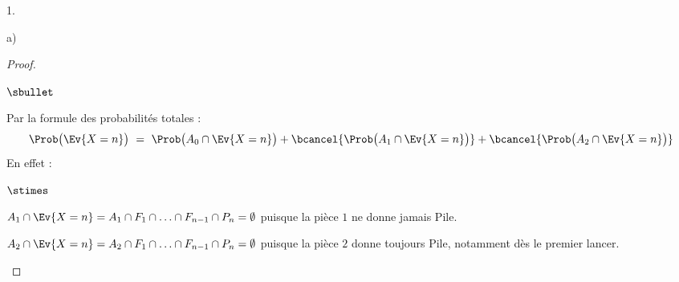 \documentclass[11pt]{article}%
\begin{document}
\begin{noliste}{1.}
\begin{noliste}{a)}
\begin{proof}
\begin{noliste}{$\sbullet$}
      \item Par la formule des probabilités totales :
        \[
        \Prob\big( \Ev{X = n} \big) \ = \ \Prob\big( A_0 \cap \Ev{X =
          n} \big) + \bcancel{\Prob\big( A_1 \cap \Ev{X = n} \big)} +
        \bcancel{\Prob\big( A_2 \cap \Ev{X = n} \big)}
        \]
        En effet :
        \begin{noliste}{$\stimes$}
        \item $A_1 \cap \Ev{X = n} = A_1 \cap F_1 \cap \ldots \cap
          F_{n-1} \cap P_n = \emptyset$ puisque la pièce $1$ ne donne
          jamais Pile.

        \item $A_2 \cap \Ev{X = n} = A_2 \cap F_1 \cap \ldots \cap
          F_{n-1} \cap P_n = \emptyset$ puisque la pièce $2$ donne
          toujours Pile, notamment dès le premier lancer.
        \end{noliste}


\end{noliste}
\end{proof}
\end{noliste}
\end{noliste}
\end{document}

